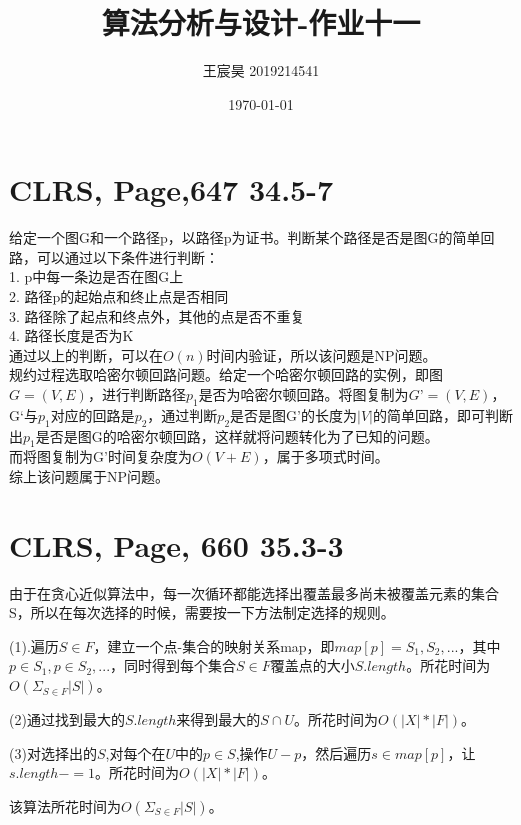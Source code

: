 \documentclass[UTF8]{ctexart}
\title{算法分析与设计-作业十一}
\author{王宸昊 2019214541}
\date{\today}
\begin{document}
\maketitle


\section{CLRS, Page,647 34.5-7}

给定一个图G和一个路径p，以路径p为证书。判断某个路径是否是图G的简单回路，可以通过以下条件进行判断：\\
1. p中每一条边是否在图G上\\
2. 路径p的起始点和终止点是否相同\\
3. 路径除了起点和终点外，其他的点是否不重复\\
4. 路径长度是否为K\\
通过以上的判断，可以在$O(n)$时间内验证，所以该问题是NP问题。\\

规约过程选取哈密尔顿回路问题。给定一个哈密尔顿回路的实例，即图$G=(V,E)$，进行判断路径$p_1$是否为哈密尔顿回路。将图复制为$G’=(V,E)$，G‘与$p_1$对应的回路是$p_2$，通过判断$p_2$是否是图G'的长度为$|V|$的简单回路，即可判断出$p_1$是否是图G的哈密尔顿回路，这样就将问题转化为了已知的问题。\\
而将图复制为G'时间复杂度为$O(V + E)$，属于多项式时间。\\

综上该问题属于NP问题。

\section{CLRS, Page, 660 35.3-3}

由于在贪心近似算法中，每一次循环都能选择出覆盖最多尚未被覆盖元素的集合S，所以在每次选择的时候，需要按一下方法制定选择的规则。

(1).遍历$S\in F$，建立一个点-集合的映射关系map，即$map[p]={S_1,S_2,...}$，其中$p\in S_1,p\in S_2,...$，同时得到每个集合$S\in F$覆盖点的大小$S.length$。所花时间为$O(\Sigma_{S\in F}|S|)$。

(2)通过找到最大的$S.length$来得到最大的$S\cap U$。所花时间为$O(|X|*|F|)$。

(3)对选择出的$S$,对每个在$U$中的$p\in S$,操作$U-{p}$，然后遍历$s \in map[p]$，让$s.length-=1$。所花时间为$O(|X|*|F|)$。

该算法所花时间为$O(\Sigma_{S\in F}|S|)$。
\end{document}
